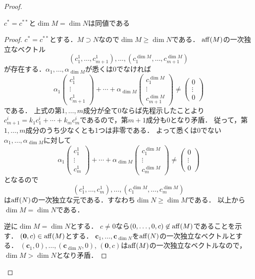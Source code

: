 \begin{proof}
  \begin{lem}
    \(c^*=c^{**}\)と\(\dim M=\dim N\)は同値である
  \end{lem}
  \begin{proof}
    \(c^*=c^{**}\)とする．\(M \supset N\)なので\(\dim M \geq \dim N\)である．
    \(\operatorname{aff}(M)\)の一次独立なベクトル
    \[ (c^1_1, \ldots, c^1_{m+1}) , \ldots , (c^{\dim M}_1, \ldots, c^{\dim M}_{m+1}) \]
    が存在する．\(\alpha_1, \ldots, \alpha_{\dim M}\)が悉くは\(0\)でなければ
    \[
    \alpha_1
    \begin{pmatrix}
      c^1_1 \\ \vdots \\ c^1_{m+1}
    \end{pmatrix}
    + \cdots +
    \alpha_{\dim M}
    \begin{pmatrix}
      c^{\dim M}_1 \\ \vdots \\ c^{\dim M}_{m+1}
    \end{pmatrix}
    \neq
    \begin{pmatrix}
      0 \\ \vdots \\ 0
    \end{pmatrix}
    \]
    である．
    上式の第\(1, \ldots, m\)成分が全て\(0\)ならば先程示したことより\(c^i_{m+1} = k_1 c^i_1 + \cdots + k_m c^i_m \)であるので，第\(m+1\)成分も\(0\)となり矛盾．
    従って，第\(1, \ldots, m\)成分のうち少なくとも1つは非零である．
    よって悉くは\(0\)でない\(\alpha_1, \ldots, \alpha_{\dim M}\)に対して
    \[
    \alpha_1
    \begin{pmatrix}
      c^1_1 \\ \vdots \\ c^1_m
    \end{pmatrix}
    + \cdots +
    \alpha_{\dim M}
    \begin{pmatrix}
      c^{\dim M}_1 \\ \vdots \\ c^{\dim M}_m
    \end{pmatrix}
    \neq
    \begin{pmatrix}
      0 \\ \vdots \\ 0
    \end{pmatrix}
    \]
    となるので
    \[ (c^1_1, \ldots, c^1_m) , \ldots , (c^{\dim M}_1, \ldots, c^{\dim M}_m) \]
    は\(\operatorname{aff}(N)\)の一次独立な元である．すなわち\(\dim N \geq \dim M\)である．
    以上から\(\dim M = \dim N\)である．

    逆に\(\dim M = \dim N\)とする．
    \(c\neq 0\)なら\((0, \ldots, 0, c) \not\in \operatorname{aff}(M)\)であることを示す．
    \((\boldsymbol{0}, c) \in \operatorname{aff}(M)\)とする．
    \(\boldsymbol{c}_1, \ldots, \boldsymbol{c}_{\dim N}\)を\(\operatorname{aff}(N)\)の一次独立なベクトルとする．
    \((\boldsymbol{c}_1, 0), \ldots, (\boldsymbol{c}_{\dim N}, 0)\), \((\boldsymbol{0}, c)\)は\(\operatorname{aff}(M)\)の一次独立なベクトルなので，\(\dim M > \dim N\)となり矛盾．


\end{proof}
\end{proof}
